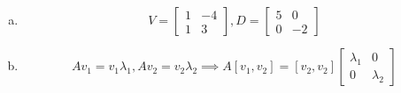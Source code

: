 \documentclass[12pt]{article}
\title{} %
\author{Liheng Cao} %
\date{\today} %
\begin{document}
\maketitle

\section{}
\begin{enumerate}[(a)]
	\item 
	\[ V = 
		\begin{bmatrix}
			1 & -4\\
			1 & 3
		\end{bmatrix}
		, D = 
		\begin{bmatrix}
			5 & 0\\
			0 & -2
		\end{bmatrix}
	\]
		 
	\item \[ Av_1 = v_1\lambda_1, Av_2 = v_2\lambda_2 \implies A [v_1, v_2] = [v_2, v_2]
		\begin{bmatrix}
			\lambda_1 & 0\\
			0 & \lambda_2
		\end{bmatrix}  
	\]
	

\end{enumerate}
\end{document}
